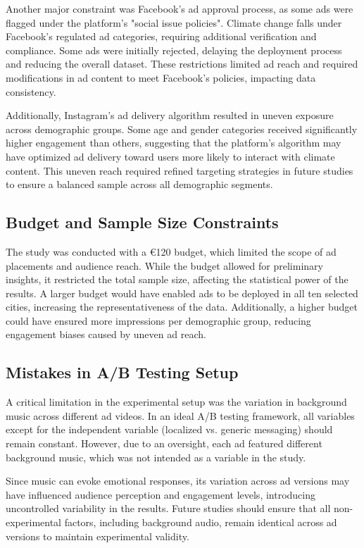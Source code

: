 \documentclass[a4paper,11pt]{article}
\begin{document}
Another major constraint was Facebook’s ad approval process, as some ads were flagged under the platform’s "social issue policies". Climate change falls under Facebook’s regulated ad categories, requiring additional verification and compliance. Some ads were initially rejected, delaying the deployment process and reducing the overall dataset. These restrictions limited ad reach and required modifications in ad content to meet Facebook’s policies, impacting data consistency.

Additionally, Instagram’s ad delivery algorithm resulted in uneven exposure across demographic groups. Some age and gender categories received significantly higher engagement than others, suggesting that the platform's algorithm may have optimized ad delivery toward users more likely to interact with climate content. This uneven reach required refined targeting strategies in future studies to ensure a balanced sample across all demographic segments.

\subsection{Budget and Sample Size Constraints}
The study was conducted with a €120 budget, which limited the scope of ad placements and audience reach. While the budget allowed for preliminary insights, it restricted the total sample size, affecting the statistical power of the results. A larger budget would have enabled ads to be deployed in all ten selected cities, increasing the representativeness of the data. Additionally, a higher budget could have ensured more impressions per demographic group, reducing engagement biases caused by uneven ad reach.

\subsection{Mistakes in A/B Testing Setup}
A critical limitation in the experimental setup was the variation in background music across different ad videos. In an ideal A/B testing framework, all variables except for the independent variable (localized vs. generic messaging) should remain constant. However, due to an oversight, each ad featured different background music, which was not intended as a variable in the study.

Since music can evoke emotional responses, its variation across ad versions may have influenced audience perception and engagement levels, introducing uncontrolled variability in the results. Future studies should ensure that all non-experimental factors, including background audio, remain identical across ad versions to maintain experimental validity.
\end{document}
